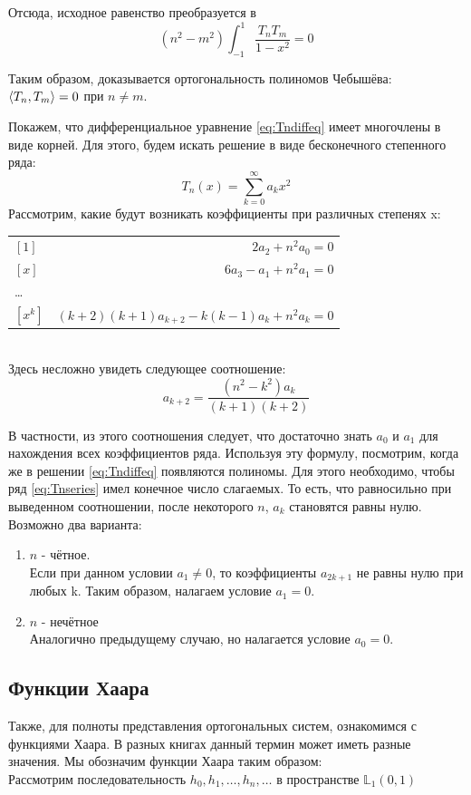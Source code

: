 \documentclass[12pt]{article}
\begin{document}
		Отсюда, исходное равенство преобразуется в
		$$(n^2 - m^2) \int_{-1}^{1} \frac{T_n T_m}{1-x^2} = 0$$
	
		Таким образом, доказывается ортогональность полиномов Чебышёва: $\left\langle T_n, T_m \right\rangle = 0$ при $n \neq m$.
	
		Покажем, что дифференциальное уравнение \eqref{eq:Tndiffeq} имеет многочлены в виде корней. Для этого, будем искать
		решение в виде бесконечного степенного ряда: 
		\begin{equation} \label{eq:Tnseries}
			T_n(x) = \sum_{k=0}^{\infty} a_k x^2
		\end{equation}
		Рассмотрим, какие будут возникать коэффициенты при различных степенях x: \\
		\begin{tabular}{l r}
			$[1]$ & $ 2a_2 + n^2 a_0 = 0 $ \\
			$[x]$ & $ 6a_3 - a_1 + n^2a_1 = 0 $ \\
			\dots \\
			$[x^k]$ & $ (k+2)(k+1) a_{k+2} - k(k-1) a_k + n^2 a_k = 0 $
		\end{tabular} \\
		Здесь несложно увидеть следующее соотношение:
		$$ a_{k+2} = \frac{(n^2 - k^2) a_k}{(k+1)(k+2)}$$
	
		В частности, из этого соотношения следует, что достаточно знать $a_0$ и $a_1$ для нахождения всех коэффициентов ряда.
		Используя эту формулу, посмотрим, когда же в решении \eqref{eq:Tndiffeq} появляются полиномы. Для этого необходимо, 
		чтобы ряд \eqref{eq:Tnseries} имел конечное число слагаемых. То есть, что равносильно при выведенном соотношении, 
		после некоторого $n$, $a_k$ становятся равны нулю. Возможно два варианта:
		\begin{enumerate}
			\item $n$ - чётное. \\
			Если при данном условии $a_1 \neq 0$, то коэффициенты $a_{2k+1}$ не равны нулю при любых k. Таким образом, налагаем
			условие $a_1 = 0$.
			\item $n$ - нечётное \\
			Аналогично предыдущему случаю, но налагается условие $a_0 = 0$.
		\end{enumerate}
	
		\subsection{Функции Хаара}
	
		Также, для полноты представления ортогональных систем, ознакомимся с функциями Хаара. В разных книгах данный термин
		может иметь разные значения. Мы обозначим функции Хаара таким образом: \\
		Рассмотрим последовательность $h_0, h_1, \dots, h_n, \dots$ в пространстве $\mathbb{L}_1(0, 1)$
	
\end{document}
